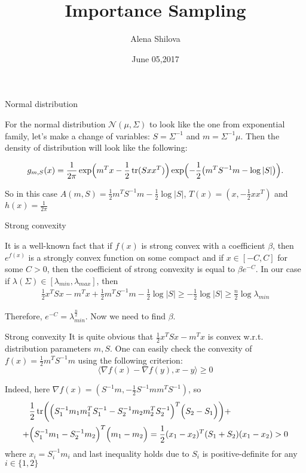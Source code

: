 \documentclass[10pt]{beamer}
\title{Importance Sampling}
\author{Alena Shilova}
\date{June 05,2017}
\institute{Skoltech}
\DeclareMathOperator{\tr}{tr}
\begin{document}
\maketitle

\begin{frame}{Normal distribution}

For the normal distribution $\mathcal{N} (\mu, \Sigma)$ to look like the one from exponential family, let's make a change of variables: $S = \Sigma^{-1}$ and $m = \Sigma^{-1} \mu$. Then the density of distribution will look like the following:

\[
g_{m,S}(x) = \frac1{2\pi} \exp \Bigl( m^T x - \frac 12 \tr( Sxx^T ) \Bigr) \exp \Bigl(- \frac 1 2 \bigl( m^TS^{-1}m - \log |S| \bigr) \Bigr).
\]

So in this case $A(m, S) = \frac 12 m^TS^{-1} m - \frac 12 \log |S|$, $T(x) = (x, -\frac 12 xx^T)$ and $h(x) = \frac 1{2\pi}$

\end{frame}

\begin{frame}{Strong convexity}

It is a well-known fact that if $f(x)$ is strong convex with a coefficient $\beta$, then $e^{f(x)}$ is a strongly convex function on some compact and if $x \in [-C, C]$ for some $C > 0$, then the coefficient of strong convexity is equal to $\beta e^{-C}$. In our case if $\lambda(\Sigma) \in [\lambda_{min}, \lambda_{max}]$, then
\begin{align*}
    \frac 12 x^T Sx - m^Tx + \frac 12 m^TS^{-1}m - \frac 12 \log|S| \geq -\frac 12 \log |S| \geq \frac n2 \log \lambda_{min}
\end{align*}

Therefore, $e^{-C} = \lambda_{min}^{\frac n2}$. Now we need to find $\beta$.

\end{frame}

\begin{frame}{Strong convexity}
It is quite obvious that $\frac 12 x^T Sx - m^Tx$ is convex w.r.t. distribution parameters $m, S$. One can easily check the convexity of $f(x) = \frac 12 m^TS^{-1}m$ using the following criterion:
\[
\langle \nabla f(x) - \nabla f(y), x-y \rangle \geq 0
\]

Indeed, here $\nabla f(x) = (S^{-1}m, - \frac 12 S^{-1} mm^TS^{-1})$, so 
\begin{align*}
&\frac 12 \tr \biggl( \Bigl( S_1^{-1} m_1m_1^TS_1^{-1} - S_2^{-1}m_2m_2^TS_2^{-1}\Bigr)^T\Bigl( S_2 -S_1 \Bigr) \biggr) + \\ 
+ &\Bigl( S_1^{-1} m_1 - S_2^{-1} m_2\Bigr)^T \Bigl( m_1-m_2 \Bigr)  = \frac 12 (x_1 - x_2)^T(S_1 + S_2)(x_1-x_2) > 0
\end{align*}
where $x_i = S_i^{-1}m_i$ and last inequality holds due to $S_i$ is positive-definite for any $i \in \{1,2\}$ 
 
\end{frame}
\end{document}
